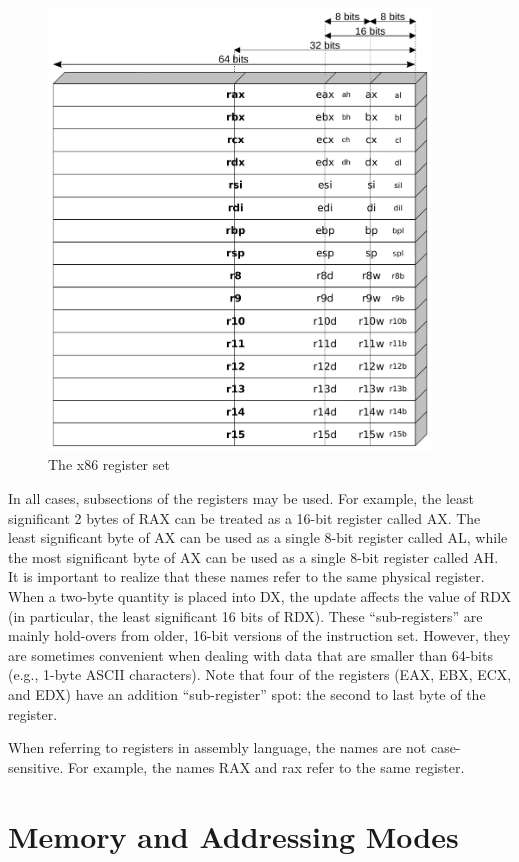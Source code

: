 \begin{figure}[h]
\begin{center}
\includegraphics[width=4in]{x86-64bit/x86-register-diagram.pdf}
\end{center}
\caption{The x86 register set}
\label{x86-register-diagram.fig}
\end{figure}

In all cases, subsections of the registers may be used.  For example,
the least significant 2 bytes of RAX can be treated as a 16-bit
register called AX.  The least significant byte of AX can be used as a
single 8-bit register called AL, while the most significant byte of AX
can be used as a single 8-bit register called AH. It is important to
realize that these names refer to the same physical register. When a
two-byte quantity is placed into DX, the update affects the value of
RDX (in particular, the least significant 16 bits of RDX). These
``sub-registers'' are mainly hold-overs from older, 16-bit versions of
the instruction set. However, they are sometimes convenient when
dealing with data that are smaller than 64-bits (e.g., 1-byte ASCII
characters).  Note that four of the registers (EAX, EBX, ECX, and EDX)
have an addition ``sub-register'' spot: the second to last byte of the
register.

When referring to registers in assembly language, the names are not
case-sensitive. For example, the names RAX and rax refer to the same
register.

\section{Memory and Addressing Modes}

